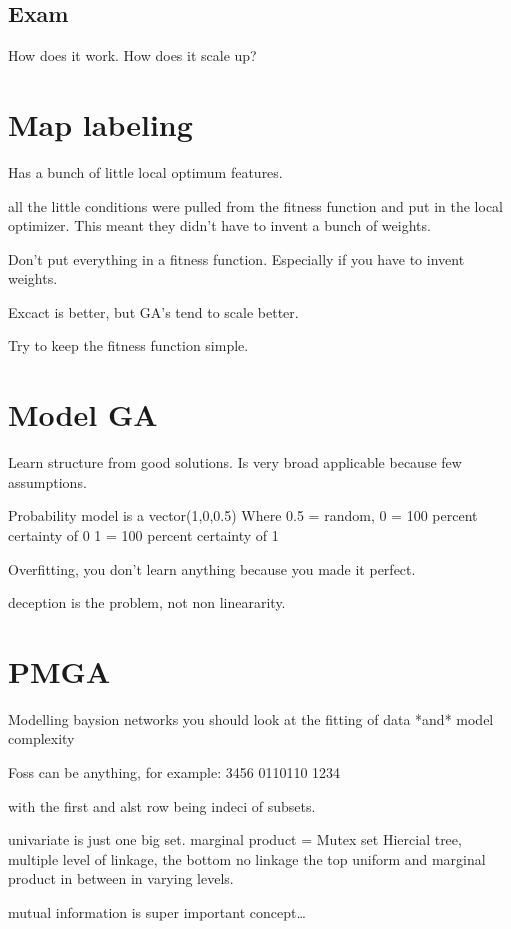 \documentclass{article}
\begin{document}
\subsection{Exam}
How does it work. How does it scale up?

\section{Map labeling}
Has a bunch of little local optimum features.

all the little conditions were pulled from the fitness function
and put in the local optimizer. This meant they didn't have to
invent a bunch of weights.

Don't put everything in a fitness function. Especially if you have
to invent weights.

Excact is better, but GA's tend to scale better.


Try to keep the fitness function simple.

\section{Model GA}
Learn structure from good solutions.
Is very broad applicable because few assumptions.

Probability model is a vector(1,0,0.5)
Where 0.5 = random,
0 = 100 percent certainty of 0
1 = 100 percent certainty of 1

Overfitting, you don't learn anything because you
made it perfect.

deception is the problem, not non lineararity.

\section{PMGA}
Modelling baysion networks you should look at the fitting of data *and* model
complexity

Foss can be anything, for example:
  3456
0110110
1234

with the first and alst row being indeci of subsets.

univariate is just one big set.
marginal product = Mutex set
Hiercial tree, multiple level of linkage, the bottom no linkage the top 
uniform and marginal product in between in varying levels.

mutual information is super important concept\ldots
\end{document}
